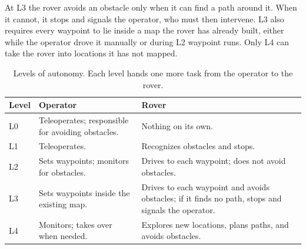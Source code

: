 \documentclass[conference]{IEEEtran}
\begin{document}
At L3 the rover avoids an obstacle only when it can find a path around
it. When it cannot, it stops and signals the operator, who must then
intervene. L3 also requires every waypoint to lie inside a map the
rover has already built, either while the operator drove it manually
or during L2 waypoint runs. Only L4 can take the rover into
locations it has not mapped.

\begin{table}[t]
\caption{Levels of autonomy. Each level hands one more task from the
operator to the rover.}
\label{tab:levels}
\centering
\small
\begin{tabularx}{\columnwidth}{@{}l>{\raggedright\arraybackslash}X>{\raggedright\arraybackslash}X@{}}
\toprule
Level & Operator & Rover \\
\midrule
L0 & Teleoperates; responsible for avoiding obstacles. & Nothing on its own. \\
L1 & Teleoperates. & Recognizes obstacles and stops. \\
L2 & Sets waypoints; monitors for obstacles. & Drives to each waypoint; does not avoid obstacles. \\
L3 & Sets waypoints inside the existing map. & Drives to each waypoint and avoids obstacles; if it finds no path, stops and signals the operator. \\
L4 & Monitors; takes over when needed. & Explores new locations, plans paths, and avoids obstacles. \\
\bottomrule
\end{tabularx}
\end{table}
\end{document}
